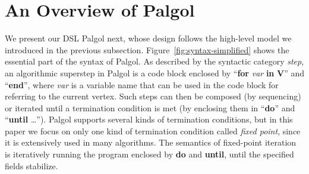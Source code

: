 \documentclass{sokendai_thesis} %
\begin{document}
\section{An Overview of Palgol}
\label{sec:syntax}

We present our DSL Palgol next, whose design follows the high-level model we introduced in the previous subsection.
Figure~\ref{fig:syntax-simplified} shows the essential part of the syntax of Palgol.
As described by the syntactic category \textit{step}, an algorithmic superstep in Palgol is a code block
enclosed by ``\textbf{for} \textit{var} \textbf{in} \textbf{V}'' and ``\textbf{end}'', where \textit{var} is a variable name that can be used in the code block for referring to the current vertex.
Such steps can then be composed (by sequencing) or iterated until a termination condition is met (by enclosing them in ``\textbf{do}'' and ``\textbf{until} \ldots'').
Palgol supports several kinds of termination conditions, but in this paper we focus on only one kind of termination condition called \textit{fixed point}, since it is extensively used in many algorithms.
The semantics of fixed-point iteration is iteratively running the program enclosed by \textbf{do} and \textbf{until}, until the specified fields stabilize.
\end{document}
